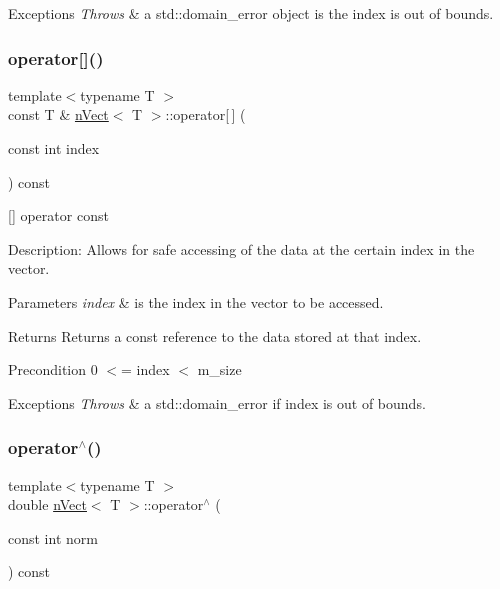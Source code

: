 \begin{DoxyExceptions}{Exceptions}
{\em Throws} & a std\+::domain\+\_\+error object is the index is out of bounds. \\
\hline
\end{DoxyExceptions}
\mbox{\label{classnVect_a65b439185fd34563833ede9390612f1c}} 
\subsubsection{\texorpdfstring{operator[]()}{operator[]()}\hspace{0.1cm}{\footnotesize\ttfamily [2/2]}}
{\footnotesize\ttfamily template$<$typename T $>$ \\
const T \& \hyperlink{classnVect}{n\+Vect}$<$ T $>$\+::operator\mbox{[}$\,$\mbox{]} (\begin{DoxyParamCaption}\item[{const int}]{index }\end{DoxyParamCaption}) const}



\mbox{[}\mbox{]} operator const 

Description\+: Allows for safe accessing of the data at the certain index in the vector. 
\begin{DoxyParams}{Parameters}
{\em index} & is the index in the vector to be accessed. \\
\hline
\end{DoxyParams}
\begin{DoxyReturn}{Returns}
Returns a const reference to the data stored at that index. 
\end{DoxyReturn}
\begin{DoxyPrecond}{Precondition}
0 $<$= index $<$ m\+\_\+size 
\end{DoxyPrecond}

\begin{DoxyExceptions}{Exceptions}
{\em Throws} & a std\+::domain\+\_\+error if index is out of bounds. \\
\hline
\end{DoxyExceptions}
\mbox{\label{classnVect_a32237bab9097b7b392c467a79d858d1a}} 
\subsubsection{\texorpdfstring{operator$^\wedge$()}{operator^()}}
{\footnotesize\ttfamily template$<$typename T $>$ \\
double \hyperlink{classnVect}{n\+Vect}$<$ T $>$\+::operator$^\wedge$ (\begin{DoxyParamCaption}\item[{const int}]{norm }\end{DoxyParamCaption}) const}



